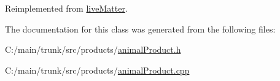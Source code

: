 Reimplemented from \hyperlink{classlive_matter_a694b548b571c88f71f2c7cc75b47d0fb}{liveMatter}.

The documentation for this class was generated from the following files:\begin{DoxyCompactItemize}
\item 
C:/main/trunk/src/products/\hyperlink{animal_product_8h}{animalProduct.h}\item 
C:/main/trunk/src/products/\hyperlink{animal_product_8cpp}{animalProduct.cpp}\end{DoxyCompactItemize}
